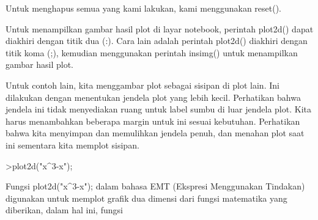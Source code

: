 \documentclass[a4paper,10pt]{article}
\begin{document}
\begin{eulernotebook}
\begin{eulercomment}
Untuk menghapus semua yang kami lakukan, kami menggunakan reset().

Untuk menampilkan gambar hasil plot di layar notebook, perintah
plot2d() dapat diakhiri dengan titik dua (:). Cara lain adalah
perintah plot2d() diakhiri dengan titik koma (;), kemudian menggunakan
perintah insimg() untuk menampilkan gambar hasil plot.

Untuk contoh lain, kita menggambar plot sebagai sisipan di plot lain.
Ini dilakukan dengan menentukan jendela plot yang lebih kecil.
Perhatikan bahwa jendela ini tidak menyediakan ruang untuk label sumbu
di luar jendela plot. Kita harus menambahkan beberapa margin untuk ini
sesuai kebutuhan. Perhatikan bahwa kita menyimpan dan memulihkan
jendela penuh, dan menahan plot saat ini sementara kita memplot
sisipan.
\end{eulercomment}
\begin{eulerprompt}
>plot2d("x^3-x");
\end{eulerprompt}
\begin{eulercomment}
Fungsi plot2d("x\textasciicircum{}3-x"); dalam bahasa EMT (Ekspresi Menggunakan
Tindakan) digunakan untuk memplot grafik dua dimensi dari fungsi
matematika yang diberikan, dalam hal ini, fungsi


\end{eulercomment}
\end{eulernotebook}
\end{document}
